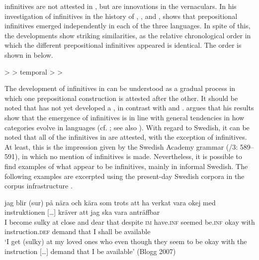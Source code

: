 \documentclass[output=paper]{langscibook}
\begin{document}
 infinitives are not attested in , but are innovations in the vernaculars. In his investigation of  infinitives in the history of , , and , \citet{Schulte2007Prepositional,Schulte2007What} shows that prepositional infinitives emerged independently in each of the three languages. In spite of this, the developments show striking similarities, as the relative chronological order in which the different prepositional infinitives appeared is identical. The order is shown in  below. 


\ea \label{ex:kalm:6}
 >  > temporal >  > 
\z

The development of  infinitives in  can be understood as a gradual process in which one prepositional construction is attested after the other. It should be noted that  has not yet developed a , in contrast with  and . \citet{Schulte2007Prepositional} argues that his results show that the emergence of  infinitives is in line with general tendencies in how  categories evolve in languages (cf. \citealt{Cristofaro2005}; see also ). With regard to Swedish, it can be noted that all of the  infinitives in  are attested, with the exception of  infinitives. At least, this is the impression given by the Swedish Academy grammar (\citealt{TelemanEtAl1999}/3: 589–591), in which no mention of  infinitives is made. Nevertheless, it is possible to find examples of what appear to be  infinitives, mainly in informal Swedish. The following examples are excerpted using the present-day Swedish corpora in the corpus infrastructure  \citep{BorinEtAl2012}. 


\ea
\label{ex:kalm:7}
\ea  \label{ex:kalm:7a}
\gll jag blir (sur) på nära och kära som trots att ha verkat vara okej med {instruktionen […]} kräver att jag ska vara anträffbar\\
I become sulky at close and dear that despite \textsc{im} have.\textsc{inf} seemed be.\textsc{inf} okay with instruction.\textsc{def} demand that I shall be available\\ 
\glt ‘I get (sulky) at my loved ones who even though they seem to be okay with the instruction […] demand that I be available’ (Blogg 2007)
\end{document}
